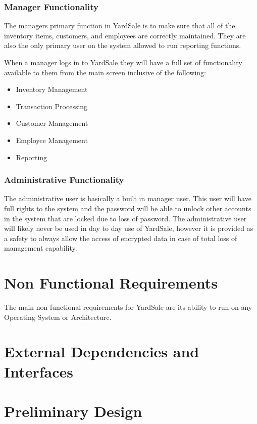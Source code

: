 \documentclass{report}
\begin{document}
\subsubsection{Manager Functionality}

The managers primary function in YardSale is to make sure that all of the inventory items, customers, and employees are correctly maintained. They are also the only primary user on the system allowed to run reporting functions.

When a manager logs in to YardSale they will have a full set of functionality available to them from the main screen inclusive of the following:

\begin{itemize}
\item Inventory Management
\item Transaction Processing
\item Customer Management
\item Employee Management
\item Reporting
\end{itemize}

\subsubsection{Administrative Functionality}

The administrative user is basically a built in manager user. This user will have full rights to the system and the password will be able to unlock other accounts in the system that are locked due to loss of password. The administrative user will likely never be used in day to day use of YardSale, however it is provided as a safety to always allow the access of encrypted data in case of total loss of management capability.

\section{Non Functional Requirements}

The main non functional requirements for YardSale are its ability to run on any Operating System or Architecture.

\section{External Dependencies and Interfaces}

\section{Preliminary Design}
\end{document}
